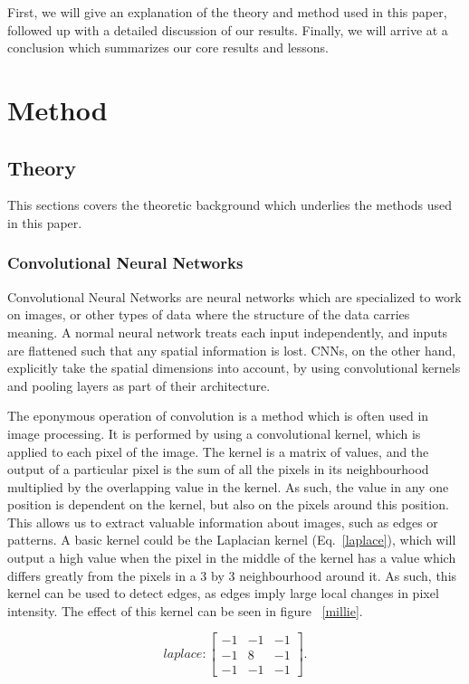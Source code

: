 \documentclass[onecolumn,10pt,cleanfoot]{asme2ej}
\begin{document}
First, we will give an explanation of the theory and method used in this paper, followed up with a detailed discussion of our results. Finally, we will arrive at a conclusion which summarizes our core results and lessons.

\section{Method}

\subsection{Theory}

This sections covers the theoretic background which underlies the methods used in this paper.

\subsubsection{Convolutional Neural Networks}

Convolutional Neural Networks are neural networks which are specialized to work on images, or other types of data where the structure of the data carries meaning. A normal neural network treats each input independently, and inputs are flattened such that any spatial information is lost. CNNs, on the other hand, explicitly take the spatial dimensions into account, by using convolutional kernels and pooling layers as part of their architecture.

The eponymous operation of convolution is a method which is often used in image processing. It is performed by using a convolutional kernel, which is applied to each pixel of the image. The kernel is a matrix of values, and the output of a particular pixel is the sum of all the pixels in its neighbourhood multiplied by the overlapping value in the kernel. As such, the value in any one position is dependent on the kernel, but also on the pixels around this position. This allows us to extract valuable information about images, such as edges or patterns. A basic kernel could be the Laplacian kernel (Eq.~\ref{laplace}), which will output a high value when the pixel in the middle of the kernel has a value which differs greatly from the pixels in a 3 by 3 neighbourhood around it. As such, this kernel can be used to detect edges, as edges imply large local changes in pixel intensity. The effect of this kernel can be seen in figure ~\ref{millie}.

\begin{equation}
\label{laplace}
laplace : 
\begin{bmatrix}
-1 & -1 & -1 \\
-1 & 8 & -1 \\
-1 & -1 & -1
\end{bmatrix}.
\end{equation}
\end{document}
